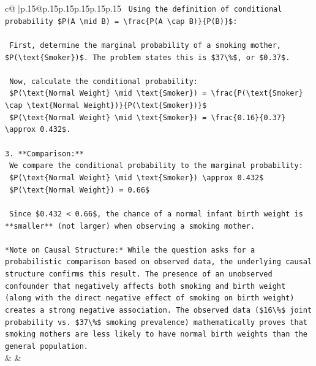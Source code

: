 \documentclass{article}
\begin{document}
{\begin{supertabular}{c@{$\;$}|p{.15\linewidth}@{}p{.15\linewidth}p{.15\linewidth}p{.15\linewidth}p{.15\linewidth}p{.15\linewidth}}
{{{\texttt{    Using the definition of conditional probability \$P(A \textbackslash{}mid B) = \textbackslash{}frac\{P(A \textbackslash{}cap B)\}\{P(B)\}\$:} \\
\\ 
\texttt{    First, determine the marginal probability of a smoking mother, \$P(\textbackslash{}text\{Smoker\})\$. The problem states this is \$37\textbackslash{}\%\$, or \$0.37\$.} \\
\\ 
\texttt{    Now, calculate the conditional probability:} \\
\texttt{    \$P(\textbackslash{}text\{Normal Weight\} \textbackslash{}mid \textbackslash{}text\{Smoker\}) = \textbackslash{}frac\{P(\textbackslash{}text\{Smoker\} \textbackslash{}cap \textbackslash{}text\{Normal Weight\})\}\{P(\textbackslash{}text\{Smoker\})\}\$} \\
\texttt{    \$P(\textbackslash{}text\{Normal Weight\} \textbackslash{}mid \textbackslash{}text\{Smoker\}) = \textbackslash{}frac\{0.16\}\{0.37\} \textbackslash{}approx 0.432\$.} \\
\\ 
\texttt{3.  **Comparison:**} \\
\texttt{    We compare the conditional probability to the marginal probability:} \\
\texttt{    \$P(\textbackslash{}text\{Normal Weight\} \textbackslash{}mid \textbackslash{}text\{Smoker\}) \textbackslash{}approx 0.432\$} \\
\texttt{    \$P(\textbackslash{}text\{Normal Weight\}) = 0.66\$} \\
\\ 
\texttt{    Since \$0.432 < 0.66\$, the chance of a normal infant birth weight is **smaller** (not larger) when observing a smoking mother.} \\
\\ 
\texttt{*Note on Causal Structure:* While the question asks for a probabilistic comparison based on observed data, the underlying causal structure confirms this result. The presence of an unobserved confounder that negatively affects both smoking and birth weight (along with the direct negative effect of smoking on birth weight) creates a strong negative association. The observed data (\$16\textbackslash{}\%\$ joint probability vs. \$37\textbackslash{}\%\$ smoking prevalence) mathematically proves that smoking mothers are less likely to have normal birth weights than the general population.} \\
            }
        }
    }
    & & \\ \\


\end{supertabular}}
\end{document}
